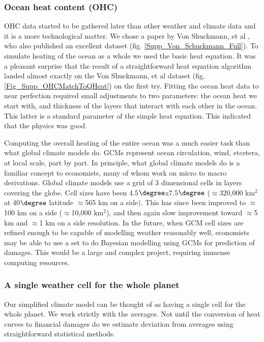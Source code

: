 \documentclass{article}
\begin{document}
\subsubsection{Ocean heat content (OHC)} OHC data started to be gathered later than other weather and climate data and it is a more technological matter. We chose a paper by Von Shuckmann, et al \cite{vonSchuckmann2020HeatstoredEarthSystem}, who also published an excellent dataset \cite{vonSchuckmann2020GCOSEHIEXPv2} (fig. \ref{Supp_Von_Schuckmann_Full}). To simulate heating of the ocean as a whole we used the basic heat equation. It was a pleasant surprise that the result of a straightforward heat equation algorithm landed almost exactly on the Von Shuckmann, et al dataset (fig. \ref{Fig_Supp_OHCMatchToQHeat}) on the first try. Fitting the ocean heat data to near perfection required small adjustments to two parameters: the ocean heat we start with, and thickness of the layers that interact with each other in the ocean. This latter is a standard parameter of the simple heat equation. This indicated that the physics was good. 

Computing the overall heating of the entire ocean was a much easier task than what global climate models do. GCMs represent ocean circulation, wind, etcetera, at local scale, part by part. In principle, what global climate models do is a familiar concept to economists, many of whom work on micro to macro derivations. Global climate models use a grid of 3 dimensional cells in layers covering the globe. Cell sizes have been 4.5$\degree$x7.5$\degree$ ($\approx$320,000 km$^{2}$ at 40$\degree$ latitude $\approx$565 km on a side). This has since been improved to $\approx$100 km on a side ($\approx$10,000 km$^{2}$), and then again slow improvement toward $\approx$5 km \cite{Warscher2019A5kmClimateSimCentralEurope} and $\approx$1 km on a side \cite{Schar2020KilometerScaleClimateModelsProspectsandChallenges} resolution.  In the future, when GCM cell sizes are refined enough to be capable of modelling weather reasonably well, economists may be able to use a set to do Bayesian modelling using GCMs for prediction of damages. This would be a large and complex project, requiring immense computing resources. 

\subsubsection{A single weather cell for the whole planet} Our simplified climate model can be thought of as having a single cell for the whole planet. We work strictly with the averages. Not until the conversion of heat curves to financial damages do we estimate deviation from averages using straightforward statistical methods. 
\end{document}
